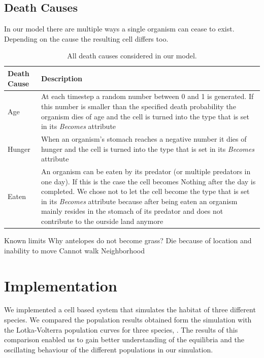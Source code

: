 \documentclass[11pt]{article}
\begin{document}
\subsection{Death Causes}
In our model there are multiple ways a single organism can cease to exist. Depending on the cause the resulting cell differs too. 
\begin{table}[htbp]
\centering
\begin{tabular}{l|p{11cm}}
Death Cause & Description \\ 
\hline 
\hline 
Age & At each timestep a random number between 0 and 1 is generated. If this number is smaller than the specified death probability the organism dies of age and the cell is turned into the type that is set in its {\it Becomes} attribute\\ 
\hline 
Hunger & When an organism's stomach reaches a negative number it dies of hunger and the cell is turned into the type that is set in its {\it Becomes} attribute\\ 
\hline 
Eaten & An organism can be eaten by its predator (or multiple predators in one day). If this is the case the cell becomes Nothing after the day is completed. We chose not to let the cell become the type that is set in its {\it Becomes} attribute because after being eaten an organism mainly resides in the stomach of its predator and does not contribute to the ourside land anymore\\  
\end{tabular}
\caption{All death causes considered in our model.}
\label{tab:deathCauses}
\end{table}


Known limits
Why antelopes do not become grass?
Die because of location and inability to move
Cannot walk
Neighborhood

\section{Implementation}
We implemented a cell based system that simulates the habitat of three different species.
We compared the population results obtained form the simulation with the Lotka-Volterra population curves for three species, \cite{lotkaVolterraThreeSpecies}. The results of this comparison enabled us to gain better understanding of the equilibria and the oscillating behaviour of the different populations in our simulation.
\end{document}
